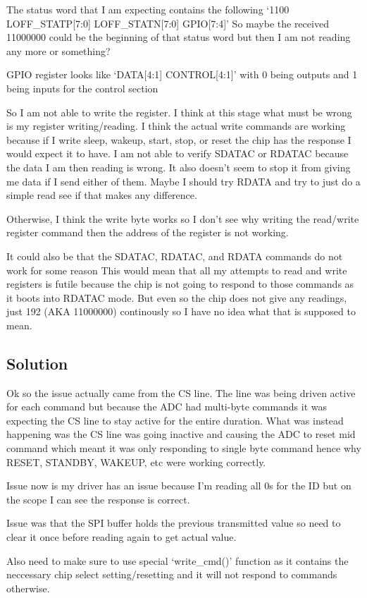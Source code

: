 The status word that I am expecting contains the following
`1100 LOFF\_STATP[7:0] LOFF\_STATN[7:0] GPIO[7:4]'
So maybe the received 11000000 could be the beginning of that status word but then I
am not reading any more or something?

GPIO register looks like `DATA[4:1] CONTROL[4:1]' with 0 being outputs and 1 being inputs
for the control section

So I am not able to write the register. I think at this stage what must be wrong is my
register writing/reading.
I think the actual write commands are working
because if I write sleep, wakeup, start, stop, or reset
the chip has the response I would expect it to have.
I am not able to verify SDATAC or RDATAC because the data I am then reading is wrong.
It also doesn't seem to stop it from giving me data if I send either of them.
Maybe I should try RDATA and try to just do a simple read see if that makes any difference.

Otherwise, I think the write byte works so I don't see why writing the read/write register
command then the address of the register is not working.

It could also be that the SDATAC, RDATAC, and RDATA commands do not work for some reason
This would mean that all my attempts to read and write registers is futile because
the chip is not going to respond to those commands as it boots into RDATAC mode.
But even so the chip does not give any readings, just 192 (AKA 11000000) continously
so I have no idea what that is supposed to mean.


\subsection{Solution}
Ok so the issue actually came from the CS line. The line was being driven active for each
command but because the ADC had multi-byte commands it was expecting the CS line to stay
active for the entire duration.
What was instead happening was the CS line was going inactive
and causing the ADC to reset mid command which meant it was only responding to single byte
command hence why RESET, STANDBY, WAKEUP, etc were working correctly.

Issue now is my driver has an issue because I'm reading all 0s for the
ID but on the scope I can see the response is correct.

Issue was that the SPI buffer holds the previous transmitted value so need to clear it once
before reading again to get actual value.

Also need to make sure to use special `write\_cmd()' function as it contains the neccessary
chip select setting/resetting and it will not respond to commands otherwise.
